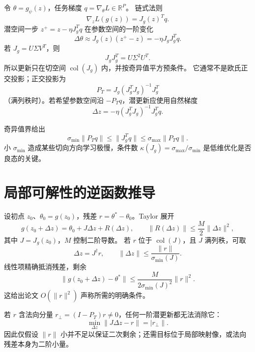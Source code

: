 \documentclass[11pt]{article}
\numberwithin{equation}{section}
\newcommand{\R}{\mathbb{R}}
\newcommand{\1}{\mathbf{1}}
\begin{document}
令 $\theta=g_\psi(z)$，任务梯度 $q=\nabla_\theta L\in\R^P$。
链式法则
\begin{equation}
 \boxed{\nabla_zL(g(z))=J_g(z)^Tq.}
\end{equation}
潜空间一步 $z^+=z-\eta J_g^Tq$ 在参数空间的一阶变化
\begin{equation}
 \Delta\theta
 \approx J_g(z)(z^+-z)
 =-\eta J_gJ_g^Tq.
\end{equation}
若 $J_g=U\Sigma V^T$，则
\begin{equation}
 J_gJ_g^T=U\Sigma^2U^T.
\end{equation}
所以更新只在切空间 $\operatorname{col}(J_g)$ 内，并按奇异值平方预条件。
它通常不是欧氏正交投影；正交投影为
\begin{equation}
 P_T=J_g(J_g^TJ_g)^{-1}J_g^T
\end{equation}
（满列秩时）。若希望参数空间沿 $-P_Tq$，潜更新应使用自然梯度
\begin{equation}
 \Delta z=-\eta(J_g^TJ_g)^{-1}J_g^Tq.
\end{equation}

奇异值界给出
\begin{equation}
 \sigma_{\min}\|P_Tq\|
 \le\|J_g^Tq\|
 \le\sigma_{\max}\|P_Tq\|.
\end{equation}
小 $\sigma_{\min}$ 造成某些切向方向学习极慢，条件数
$\kappa(J_g)=\sigma_{\max}/\sigma_{\min}$ 是低维优化是否良态的关键。

\section{局部可解性的逆函数推导}

设初点 $z_0$、$\theta_0=g(z_0)$，残差
$r=\theta^*-\theta_0$。Taylor 展开
\begin{equation}
 g(z_0+\Delta z)=\theta_0+J\Delta z+R(\Delta z),
 \qquad\|R(\Delta z)\|\le\frac M2\|\Delta z\|^2,
\end{equation}
其中 $J=J_g(z_0)$，$M$ 控制二阶导数。
若 $r$ 位于 $\operatorname{col}(J)$，且 $J$ 满列秩，可取
\begin{equation}
 \Delta z=J^\dagger r,\qquad
 \|\Delta z\|\le\frac{\|r\|}{\sigma_{\min}(J)}.
\end{equation}
线性项精确抵消残差，剩余
\begin{equation}
 \|g(z_0+\Delta z)-\theta^*\|
 \le\frac M{2\sigma_{\min}(J)^2}\|r\|^2.
\end{equation}
这给出论文 $O(\|r\|^2)$ 声称所需的明确条件。

若 $r$ 含法向分量 $r_\perp=(I-P_T)r\ne0$，任何一阶潜更新都无法消除它：
\begin{equation}
 \min_{\Delta z}\|J\Delta z-r\|=|r_\perp\|.
\end{equation}
因此仅假设 $\|r\|$ 小并不足以保证二次剩余；还需目标位于局部映射像，或法向残差本身为二阶小量。
\end{document}

